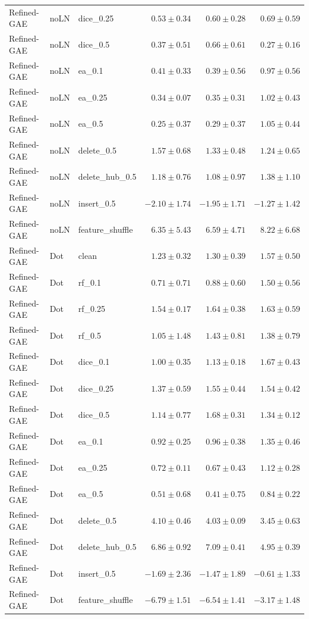\documentclass[UTF8,a4paper,11pt,fontset=fandol]{ctexart}
\begin{document}
{\begin{longtable}{lllrrr}
Refined-GAE & noLN & dice\_0.25 & $0.53\pm0.34$ & $0.60\pm0.28$ & $0.69\pm0.59$ \\
Refined-GAE & noLN & dice\_0.5 & $0.37\pm0.51$ & $0.66\pm0.61$ & $0.27\pm0.16$ \\
Refined-GAE & noLN & ea\_0.1 & $0.41\pm0.33$ & $0.39\pm0.56$ & $0.97\pm0.56$ \\
Refined-GAE & noLN & ea\_0.25 & $0.34\pm0.07$ & $0.35\pm0.31$ & $1.02\pm0.43$ \\
Refined-GAE & noLN & ea\_0.5 & $0.25\pm0.37$ & $0.29\pm0.37$ & $1.05\pm0.44$ \\
Refined-GAE & noLN & delete\_0.5 & $1.57\pm0.68$ & $1.33\pm0.48$ & $1.24\pm0.65$ \\
Refined-GAE & noLN & delete\_hub\_0.5 & $1.18\pm0.76$ & $1.08\pm0.97$ & $1.38\pm1.10$ \\
Refined-GAE & noLN & insert\_0.5 & $-2.10\pm1.74$ & $-1.95\pm1.71$ & $-1.27\pm1.42$ \\
Refined-GAE & noLN & feature\_shuffle & $6.35\pm5.43$ & $6.59\pm4.71$ & $8.22\pm6.68$ \\
Refined-GAE & Dot & clean & $1.23\pm0.32$ & $1.30\pm0.39$ & $1.57\pm0.50$ \\
Refined-GAE & Dot & rf\_0.1 & $0.71\pm0.71$ & $0.88\pm0.60$ & $1.50\pm0.56$ \\
Refined-GAE & Dot & rf\_0.25 & $1.54\pm0.17$ & $1.64\pm0.38$ & $1.63\pm0.59$ \\
Refined-GAE & Dot & rf\_0.5 & $1.05\pm1.48$ & $1.43\pm0.81$ & $1.38\pm0.79$ \\
Refined-GAE & Dot & dice\_0.1 & $1.00\pm0.35$ & $1.13\pm0.18$ & $1.67\pm0.43$ \\
Refined-GAE & Dot & dice\_0.25 & $1.37\pm0.59$ & $1.55\pm0.44$ & $1.54\pm0.42$ \\
Refined-GAE & Dot & dice\_0.5 & $1.14\pm0.77$ & $1.68\pm0.31$ & $1.34\pm0.12$ \\
Refined-GAE & Dot & ea\_0.1 & $0.92\pm0.25$ & $0.96\pm0.38$ & $1.35\pm0.46$ \\
Refined-GAE & Dot & ea\_0.25 & $0.72\pm0.11$ & $0.67\pm0.43$ & $1.12\pm0.28$ \\
Refined-GAE & Dot & ea\_0.5 & $0.51\pm0.68$ & $0.41\pm0.75$ & $0.84\pm0.22$ \\
Refined-GAE & Dot & delete\_0.5 & $4.10\pm0.46$ & $4.03\pm0.09$ & $3.45\pm0.63$ \\
Refined-GAE & Dot & delete\_hub\_0.5 & $6.86\pm0.92$ & $7.09\pm0.41$ & $4.95\pm0.39$ \\
Refined-GAE & Dot & insert\_0.5 & $-1.69\pm2.36$ & $-1.47\pm1.89$ & $-0.61\pm1.33$ \\
Refined-GAE & Dot & feature\_shuffle & $-6.79\pm1.51$ & $-6.54\pm1.41$ & $-3.17\pm1.48$ \\
\end{longtable}
}
\end{document}
